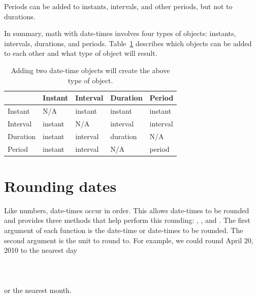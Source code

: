\documentclass[article]{jss}
\begin{document}
Periods can be added to instants, intervals, and other periods, but not to durations.


In summary, math with date-times involves four types of objects: instants, intervals, durations, and periods. Table~\ref{tbl:date-math} describes which objects can be added to each other and what type of object will result.

\begin{table}
  \begin{center}
  \begin{tabular}{lllll}
  & Instant & Interval & Duration & Period\\
  \toprule
  Instant & N/A & instant & instant & instant\\
  Interval & instant & N/A & interval & interval\\
  Duration & instant & interval & duration & N/A\\
  Period & instant & interval & N/A & period\\
  \bottomrule
    
  \end{tabular}
  \end{center}
  \caption{Adding two date-time objects will create the above type of object.}
  \label{tbl:date-math}
\end{table}

\section{Rounding dates}
Like numbers, date-times occur in order. This allows date-times to be rounded and  provides three methods that help perform this rounding: , , and . The first argument of each function is the date-time or date-times to be rounded. The second argument is the unit to round to. For example, we could round April 20, 2010 to the nearest day\\

\\
\\
\\

or the nearest month.\\

\\
\\
\end{document}
